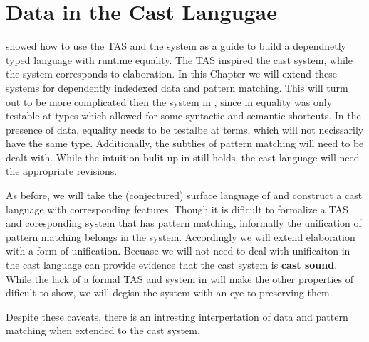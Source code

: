 \chapter{Data in the Cast Langugae}
\label{chapter:CastData}
\thispagestyle{myheadings}


 showed how to use the \ac{TAS} and the \bidir{} system as a guide to build a dependnetly typed language with runtime equality.
The \ac{TAS} inspired the cast system, while the \bidir{} system corresponds to elaboration.
In this Chapter we will extend these systems for dependently indedexed data and pattern matching.
This will turm out to be more complicated then the system in , since in  equality was only testable at types which allowed for some syntactic and semantic shortcuts.
In the presence of data, equality needs to be testalbe at terms, which will not necissarily have the same type. 
Additionally, the subtlies of pattern matching will need to be dealt with.
While the intuition bulit up in  still holds, the cast language will need the appropriate revisions.

As before, we will take the (conjectured) surface language of  and construct a cast language with corresponding features.
Though it is dificult to formalize a \ac{TAS} and coresponding \bidir{} system that has pattern matching, informally the unification of pattern matching belongs in the \bidir{} system.
Accordingly we will extend elaboration with a form of unification.
Becuase we will not need to deal with unificaiton in the cast language can provide evidence that the cast system is \textbf{cast sound}. 
While the lack of a formal \ac{TAS} and \bidir{} system in  will make the other properties of  dificult to show, we will degisn the system with an eye to preserving them.


Despite these caveats, there is an intresting interpertation of data and pattern matching when extended to the cast system.

